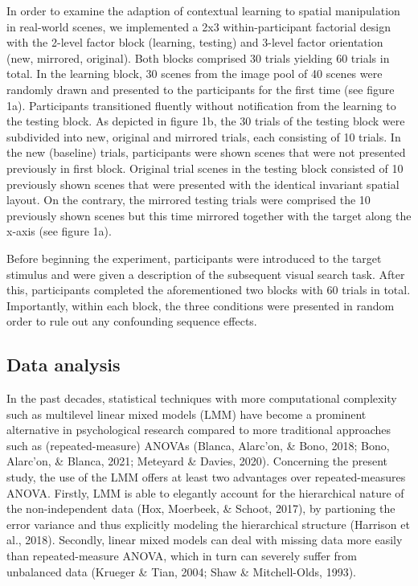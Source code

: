 \documentclass[
  man,floatsintext]{apa7}
\begin{document}
In order to examine the adaption of contextual learning to spatial manipulation in real-world scenes, we implemented a 2x3 within-participant factorial design with the 2-level factor block (learning, testing) and 3-level factor orientation (new, mirrored, original). Both blocks comprised 30 trials yielding 60 trials in total. In the learning block, 30 scenes from the image pool of 40 scenes were randomly drawn and presented to the participants for the first time (see figure 1a). Participants transitioned fluently without notification from the learning to the testing block. As depicted in figure 1b, the 30 trials of the testing block were subdivided into new, original and mirrored trials, each consisting of 10 trials. In the new (baseline) trials, participants were shown scenes that were not presented previously in first block. Original trial scenes in the testing block consisted of 10 previously shown scenes that were presented with the identical invariant spatial layout. On the contrary, the mirrored testing trials were comprised the 10 previously shown scenes but this time mirrored together with the target along the x-axis (see figure 1a).

Before beginning the experiment, participants were introduced to the target stimulus and were given a description of the subsequent visual search task. After this, participants completed the aforementioned two blocks with 60 trials in total. Importantly, within each block, the three conditions were presented in random order to rule out any confounding sequence effects.

\hypertarget{data-analysis}{%
\subsection{Data analysis}\label{data-analysis}}

In the past decades, statistical techniques with more computational complexity such as multilevel linear mixed models (LMM) have become a prominent alternative in psychological research compared to more traditional approaches such as (repeated-measure) ANOVAs (Blanca, Alarc'on, \& Bono, 2018; Bono, Alarc'on, \& Blanca, 2021; Meteyard \& Davies, 2020). Concerning the present study, the use of the LMM offers at least two advantages over repeated-measures ANOVA. Firstly, LMM is able to elegantly account for the hierarchical nature of the non-independent data (Hox, Moerbeek, \& Schoot, 2017), by partioning the error variance and thus explicitly modeling the hierarchical structure (Harrison et al., 2018). Secondly, linear mixed models can deal with missing data more easily than repeated-measure ANOVA, which in turn can severely suffer from unbalanced data (Krueger \& Tian, 2004; Shaw \& Mitchell-Olds, 1993).
\end{document}
